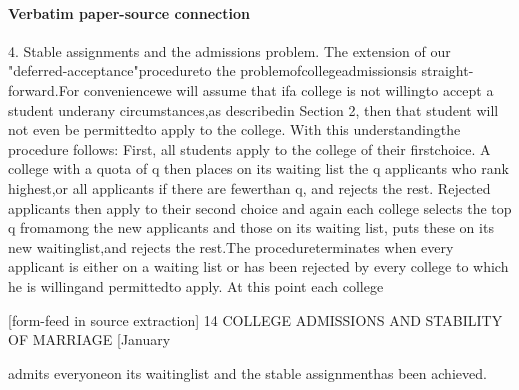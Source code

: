 \documentclass[10pt]{article}
\begin{document}
\paragraph{Verbatim paper-source connection}
\begin{ReviewVerbatim}
4. Stable assignments and the admissions problem. The extension of our
"deferred-acceptance"procedureto the problemofcollegeadmissionsis straight-
forward.For conveniencewe will assume that ifa college is not willingto accept
a student underany circumstances,as describedin Section 2, then that student
will not even be permittedto apply to the college. With this understandingthe
procedure follows: First, all students apply to the college of their firstchoice.
A college with a quota of q then places on its waiting list the q applicants who
rank highest,or all applicants if there are fewerthan q, and rejects the rest.
Rejected applicants then apply to their second choice and again each college
selects the top q fromamong the new applicants and those on its waiting list,
puts these on its new waitinglist,and rejects the rest.The procedureterminates
when every applicant is either on a waiting list or has been rejected by every
college to which he is willingand permittedto apply. At this point each college

[form-feed in source extraction]
14             COLLEGE ADMISSIONS AND STABILITY OF MARRIAGE              [January

admits everyoneon its waitinglist and the stable assignmenthas been achieved.
\end{ReviewVerbatim}
\end{document}
